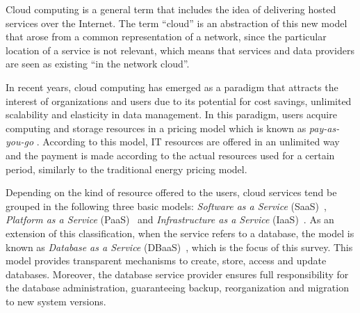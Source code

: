
Cloud computing is a general term that includes the idea of delivering hosted services over the Internet. The term ``cloud'' is an abstraction of this new model that arose from a common representation of a network, since the particular location of a service is not relevant, {\al which means that services and data providers are seen} as existing ``in the network cloud''.

In recent years, cloud computing has emerged as a paradigm that attracts the interest of organizations and users {\al due to} its potential for cost savings, unlimited scalability and elasticity in data management. In this paradigm, users acquire computing and storage resources in a pricing model which is known as \emph{pay-as-you-go} \cite{Al-Roomi13}. According to this model, IT resources are offered in an unlimited way and the payment is made according to the actual resources used for a certain period, similarly to the traditional energy pricing model.


Depending on the kind of resource offered to the users, cloud services tend be grouped in the following three basic models: \emph{Software as a Service} (SaaS)~\cite{dubey2007delivering}, \emph{Platform as a Service} (PaaS)~\cite{beimborn2011platform} and \emph{Infrastructure as a Service} (IaaS)~\cite{bhardwaj2010cloud}. As an extension of this classi\-fication, when the service refers to a database, the model is known as \emph{Database as a Service} (DBaaS)~\cite{curino2011relational}, {\al which is the focus of this survey}. {\rc  This model provides transparent mechanisms to create, store, access and update databases. Moreover, the database service provider ensures full responsibility for the database administration, guaranteeing backup, reorganization and migration to new system versions.}


